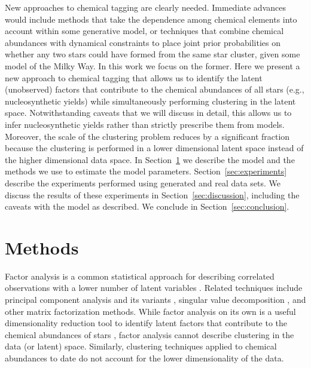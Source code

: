 \documentclass[twocolumn]{aastex62}
\begin{document}
New approaches to chemical tagging are clearly needed. Immediate advances would
include methods that take the dependence among chemical elements into account
within some generative model, or techniques that combine chemical abundances
with dynamical constraints to place joint prior probabilities on whether any
two stars could have formed from the same star cluster, given some model of the
Milky Way. In this work we focus on the former. Here we present a new approach
to chemical tagging that allows us to identify the latent (unobserved) factors
that contribute to the chemical abundances of all stars (e.g., nucleosynthetic
yields) while simultaneously performing clustering in the latent space.
Notwithstanding caveats that we will
discuss in detail, this allows us to infer nucleosynthetic yields rather than
strictly prescribe them from models. Moreover, the scale of the clustering
problem reduces by a significant fraction because the clustering is performed in
a lower dimensional latent space instead of the higher dimensional data space.
In Section~\ref{sec:methods} we describe the model and the methods we use to
estimate the model parameters. Section~\ref{sec:experiments} describe the 
experiments performed using generated and real data sets. We discuss the results
of these experiments in Section~\ref{sec:discussion}, including the caveats with
the model as described. We conclude in Section~\ref{sec:conclusion}.



\section{Methods} \label{sec:methods}

Factor analysis is a common statistical approach for describing correlated 
observations with a lower number of latent variables \citep[e.g.,][]{Thompson:2004}.
Related techniques include principal component analysis \citep{Hotelling:1933} and its
variants \citep{Tipping;Bishop:1999}, singular value decomposition \citep{Golub:1970}, and other
matrix factorization methods. While factor analysis on its own is a useful
dimensionality reduction tool to identify latent factors that contribute to
the chemical abundances of stars \citep[e.g.,][]{Price-Jones:2018}, factor
analysis cannot describe clustering in the data (or latent) space.
Similarly, clustering techniques applied to chemical abundances to date 
\citep[e.g.,][]{Hogg:2016} do not account for the lower dimensionality of the
data. 
\end{document}
